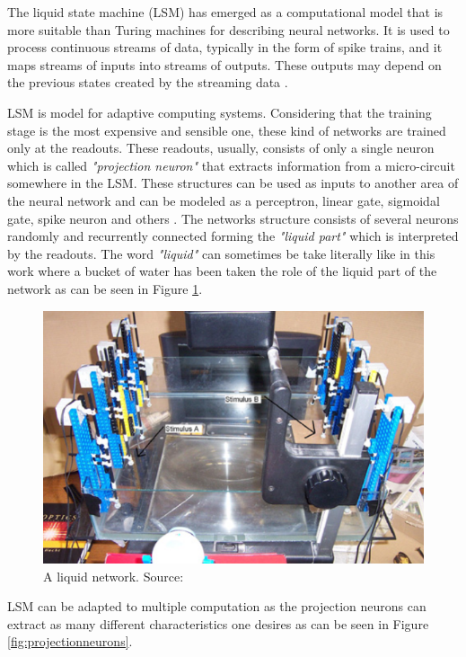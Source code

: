 \begin{frame}[allowframebreaks]
	\par The liquid state machine (LSM) has emerged as a computational model that is more suitable than Turing machines for describing neural networks. It is used to process continuous streams of data, typically in the form of spike trains, and it maps streams of inputs into streams of outputs. These outputs may depend on the previous states created by the streaming data \cite{doi:10.1142/9781848162778_0008}.
	
	\par LSM is model for adaptive computing systems. Considering that the training stage is the most expensive and sensible one, these kind of networks are trained only at the readouts. These readouts, usually, consists of only a single neuron which is called \textit{"projection neuron"} that extracts information from a micro-circuit somewhere in the LSM. These structures can be used as inputs to another area of the neural network and can be modeled as a perceptron, linear gate, sigmoidal gate, spike neuron and others \cite{doi:10.1142/9781848162778_0008}. The networks structure consists of several neurons randomly and recurrently connected forming the \textit{"liquid part"} which is interpreted by the readouts. The word \textit{"liquid"} can sometimes be take literally like in this work \cite{10.1007/978-3-540-39432-7_63} where a bucket of water has been taken the role of the liquid part of the network as can be seen in Figure \ref{fig:leterallyaliquidnetwork}.
	
	\begin{figure}
		\centering
		\includegraphics[width=0.7\linewidth]{images/leterallyALiquidNetwork}
		\caption[A liquid network]{A liquid network. Source: \cite{10.1007/978-3-540-39432-7_63}}
		\label{fig:leterallyaliquidnetwork}
	\end{figure}
	
	\par LSM can be adapted to multiple computation as the projection neurons can extract as many different characteristics one desires as can be seen in Figure \ref{fig:projectionneurons}.
	

\end{frame}
